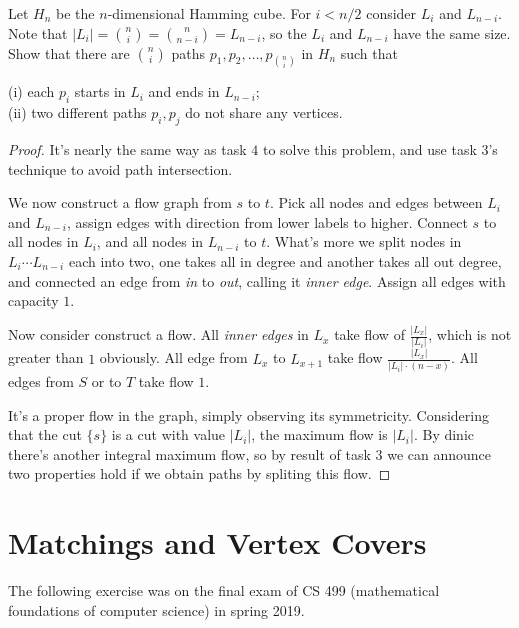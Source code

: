 \documentclass[11pt,a4paper,oneside]{article}
\begin{document}
\begin{problem}{5}
	\statement
  Let $H_n$ be the $n$-dimensional Hamming cube. For $i < n/2$ consider
  $L_i$ and $L_{n-i}$. Note that 
  $|L_i| = {n \choose i} = { n \choose n-i}  = L_{n-i}$, so the 
  $L_i$ and $L_{n-i}$ have the same size.   Show that there are ${n \choose i}$ paths $p_1,p_2,\dots,p_{ {n \choose i}}$
  in $H_n$ such that

  (i) each $p_i$ starts in $L_i$ and ends in $L_{n-i}$; \\
  (ii) two different paths $p_i,p_j$ do not share any vertices.
  
    \solution
    \begin{proof}
      It's nearly the same way as task $4$ to solve this problem, and use task $3$'s technique to avoid path intersection.  

      We now construct a flow graph from $s$ to $t$. Pick all nodes and edges between $L_i$ and $L_{n - i}$, assign edges with direction from lower labels to higher. Connect $s$ to all nodes in $L_i$, and all nodes in $L_{n - i}$ to $t$. What's more we split nodes in $L_i \cdots L_{n - i}$ each into two, one takes all in degree and another takes all out degree, and connected an edge from \textit{in} to \textit{out}, calling it \textit{inner edge}. Assign all edges with capacity $1$.

      Now consider construct a flow. All \textit{inner edges} in $L_x$ take flow of $\frac {|L_x|} {|L_i|}$, which is not greater than $1$ obviously. All edge from $L_{x}$ to $L_{x + 1}$ take flow $\frac {|L_x|} {|L_i| \cdot (n - x)}$. All edges from $S$ or to $T$ take flow $1$.
      
      It's a proper flow in the graph, simply observing its symmetricity. Considering that the cut $\{s\}$ is a cut with value $|L_i|$, the maximum flow is $|L_i|$. By dinic there's another integral maximum flow, so by result of task $3$ we can announce two properties hold if we obtain paths by spliting this flow.
    \end{proof}
\end{problem}


\section*{Matchings and Vertex Covers}

The following exercise was on the final exam of CS 499 (mathematical foundations of computer science) in spring 2019.
\end{document}

